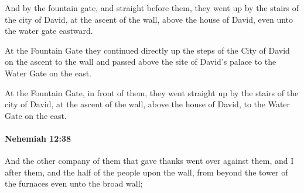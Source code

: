 			\begin{versebox}
					\item[BHS] 
					\item[LXX] 
					\item[ASV] And by the fountain gate, and straight before them, they went up by the stairs of the city of David, at the ascent of the wall, above the house of David, even unto the water gate eastward.
					\item[NIV] At the Fountain Gate they continued directly up the steps of the City of David on the ascent to the wall and passed above the site of David’s palace to the Water Gate on the east.
					\item[NRSV] At the Fountain Gate, in front of them, they went straight up by the stairs of the city of David, at the ascent of the wall, above the house of David, to the Water Gate on the east.
			\end{versebox}

		\paragraph{Nehemiah 12:38} %
			\label{NEHEMIAH-12-38}

			And the other company of them that gave thanks went over against them, and I after them, and the half of the people upon the wall, from beyond the tower of the furnaces even unto the broad wall;

